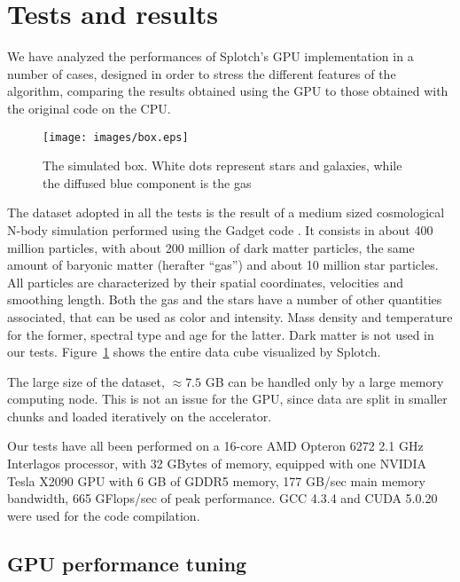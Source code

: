 \documentclass[11pt]{article}
\begin{document}
\section{Tests and results}
\label{sec:results}

We have analyzed the performances of Splotch's GPU implementation in a number of cases, designed in 
order to stress the different features of the algorithm, 
comparing the results 
obtained using the GPU to those obtained with the original code on the CPU. 

\begin{figure}
\centering
\texttt{[image: images/box.eps]}
\caption{The simulated box. White dots represent stars and galaxies, while the 
diffused blue component is the gas}
\label{fig:box}
\end{figure}

The dataset adopted in all the tests is the result of a medium sized cosmological 
N-body simulation performed using the Gadget code \cite{gadgeturl}. It consists in about 
400 million particles, with about 200 million of dark matter particles, the same amount 
of baryonic matter (herafter ``gas'') and about 10 million star particles. 
All particles are characterized by their spatial coordinates, velocities
and smoothing length. 
Both the gas and the stars have a number of other quantities associated, that can be used 
as color and intensity. Mass density and temperature for the former, spectral type and age
for the latter. Dark matter is not used in our tests. Figure~\ref{fig:box} shows 
the entire data cube visualized by Splotch.

The large size of the dataset, $\approx 7.5$ GB can be handled only by a large memory computing node. 
This is not an issue for the GPU, since data are split 
in smaller chunks and loaded iteratively on the accelerator. 

Our tests have all been performed on a 16-core AMD Opteron 6272 2.1 GHz Interlagos processor,
with 32 GBytes of memory, equipped with one NVIDIA Tesla X2090 GPU with 6 GB of GDDR5 memory,
177 GB/sec 
main memory bandwidth, 665 GFlops/sec of peak performance. GCC 4.3.4 and CUDA 5.0.20 
were used for the code compilation.

\subsection{GPU performance tuning}
\label{sec:gpuperf}

\end{document}
